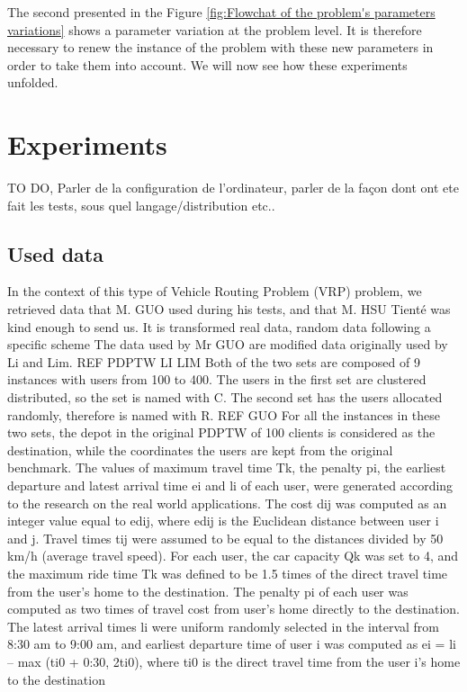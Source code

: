 \documentclass[12pt, a4paper,twoside]{memoir}
\newcommand{\newpar}{\vskip 0.2in \noindent}
\begin{document}
	\noindent The second presented in the Figure \ref{fig:Flowchat of the problem's parameters variations} shows a parameter variation at the problem level. It is therefore necessary to renew the instance of the problem with these new parameters in order to take them into account.
	\newpar
	We will now see how these experiments unfolded.
	
	\cleardoublepage
	\chapter{Experiments}
	
	TO DO, Parler de la configuration de l'ordinateur, parler de la façon dont ont ete fait les tests, sous quel langage/distribution etc..
	
	\section{Used data}
	In the context of this type of Vehicle Routing Problem (VRP) problem, we retrieved data that M. GUO used during his tests, and that M. HSU Tienté was kind enough to send us.
	It is transformed real data, random data following a specific scheme 
	The data used by Mr GUO are modified data originally used by Li and Lim.
	REF PDPTW LI LIM
	Both of the two sets are composed of 9 instances with users from 100 to 400. The users in the first set are clustered distributed, so the set is named with C. The second set has the users allocated randomly, therefore is named with R.
	REF GUO
	For all the instances in these two sets, the depot in the original PDPTW of 100 clients is considered as the destination, while the coordinates the users are kept from the original benchmark. The values of maximum travel time Tk, the penalty pi, the earliest departure and latest arrival time ei and li of each user, were generated according to the research on the real world applications. The cost dij was computed as an integer value equal to edij, where edij is the Euclidean distance between user i and j. Travel times tij were assumed to be equal to the distances divided by 50 km/h (average travel speed). For each user, the car capacity Qk was set to 4, and the maximum ride time Tk was defined to be 1.5 times of the direct travel time from the user’s home to the destination. The penalty pi of each user was computed as two times of travel cost from user’s home directly to the destination. The latest arrival times li were uniform randomly selected in the interval from 8:30 am to 9:00 am, and earliest departure time of user i was computed as ei = li – max (ti0 + 0:30, 2ti0), where ti0 is the direct travel time from the user i’s home to the destination
	
\end{document}
